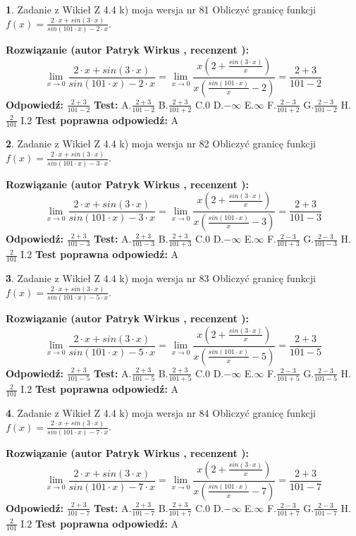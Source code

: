 \documentclass[12pt, a4paper]{article}
\theoremstyle{definition} %
\newtheorem{zad}{}
\newcommand{\zadStart}[1]{\begin{zad}#1\newline}
\newcommand{\zadStop}{\end{zad}}
\newcommand{\rozwStart}[2]{\noindent \textbf{Rozwiązanie (autor #1 , recenzent #2): }\newline}
\newcommand{\rozwStop}{\newline}
\newcommand{\odpStart}{\noindent \textbf{Odpowiedź:}\newline}
\newcommand{\odpStop}{\newline}
\newcommand{\testStart}{\noindent \textbf{Test:}\newline}
\newcommand{\testStop}{\newline}
\newcommand{\kluczStart}{\noindent \textbf{Test poprawna odpowiedź:}\newline}
\newcommand{\kluczStop}{\newline}
\begin{document}
\zadStart{Zadanie z Wikieł Z 4.4 k) moja wersja nr 81}
Obliczyć granicę funkcji $f(x)=\frac{2\cdot x +sin(3\cdot x)}{sin(101\cdot x) -2\cdot x}$.
\zadStop
\rozwStart{Patryk Wirkus}{}
$$\lim\limits_{x\to 0}\frac{2\cdot x +sin(3\cdot x)}{sin(101\cdot x) -2\cdot x}
=\lim\limits_{x\to 0}\frac{x(2+\frac{sin(3\cdot x)}{x})}{x(\frac{sin(101\cdot x)}{x}-2)}
=\frac{2+3}{101-2}$$
\rozwStop
\odpStart
$\frac{2+3}{101-2}$
\odpStop
\testStart
A.$\frac{2+3}{101-2}$
B.$\frac{2+3}{101+2}$
C.$0$
D.$-\infty$
E.$\infty$
F.$\frac{2-3}{101+2}$
G.$\frac{2-3}{101-2}$
H.$\frac{2}{101}$
I.$2$
\testStop
\kluczStart
A
\kluczStop



\zadStart{Zadanie z Wikieł Z 4.4 k) moja wersja nr 82}
Obliczyć granicę funkcji $f(x)=\frac{2\cdot x +sin(3\cdot x)}{sin(101\cdot x) -3\cdot x}$.
\zadStop
\rozwStart{Patryk Wirkus}{}
$$\lim\limits_{x\to 0}\frac{2\cdot x +sin(3\cdot x)}{sin(101\cdot x) -3\cdot x}
=\lim\limits_{x\to 0}\frac{x(2+\frac{sin(3\cdot x)}{x})}{x(\frac{sin(101\cdot x)}{x}-3)}
=\frac{2+3}{101-3}$$
\rozwStop
\odpStart
$\frac{2+3}{101-3}$
\odpStop
\testStart
A.$\frac{2+3}{101-3}$
B.$\frac{2+3}{101+3}$
C.$0$
D.$-\infty$
E.$\infty$
F.$\frac{2-3}{101+3}$
G.$\frac{2-3}{101-3}$
H.$\frac{2}{101}$
I.$2$
\testStop
\kluczStart
A
\kluczStop



\zadStart{Zadanie z Wikieł Z 4.4 k) moja wersja nr 83}
Obliczyć granicę funkcji $f(x)=\frac{2\cdot x +sin(3\cdot x)}{sin(101\cdot x) -5\cdot x}$.
\zadStop
\rozwStart{Patryk Wirkus}{}
$$\lim\limits_{x\to 0}\frac{2\cdot x +sin(3\cdot x)}{sin(101\cdot x) -5\cdot x}
=\lim\limits_{x\to 0}\frac{x(2+\frac{sin(3\cdot x)}{x})}{x(\frac{sin(101\cdot x)}{x}-5)}
=\frac{2+3}{101-5}$$
\rozwStop
\odpStart
$\frac{2+3}{101-5}$
\odpStop
\testStart
A.$\frac{2+3}{101-5}$
B.$\frac{2+3}{101+5}$
C.$0$
D.$-\infty$
E.$\infty$
F.$\frac{2-3}{101+5}$
G.$\frac{2-3}{101-5}$
H.$\frac{2}{101}$
I.$2$
\testStop
\kluczStart
A
\kluczStop



\zadStart{Zadanie z Wikieł Z 4.4 k) moja wersja nr 84}
Obliczyć granicę funkcji $f(x)=\frac{2\cdot x +sin(3\cdot x)}{sin(101\cdot x) -7\cdot x}$.
\zadStop
\rozwStart{Patryk Wirkus}{}
$$\lim\limits_{x\to 0}\frac{2\cdot x +sin(3\cdot x)}{sin(101\cdot x) -7\cdot x}
=\lim\limits_{x\to 0}\frac{x(2+\frac{sin(3\cdot x)}{x})}{x(\frac{sin(101\cdot x)}{x}-7)}
=\frac{2+3}{101-7}$$
\rozwStop
\odpStart
$\frac{2+3}{101-7}$
\odpStop
\testStart
A.$\frac{2+3}{101-7}$
B.$\frac{2+3}{101+7}$
C.$0$
D.$-\infty$
E.$\infty$
F.$\frac{2-3}{101+7}$
G.$\frac{2-3}{101-7}$
H.$\frac{2}{101}$
I.$2$
\testStop
\kluczStart
A
\kluczStop
\end{document}

